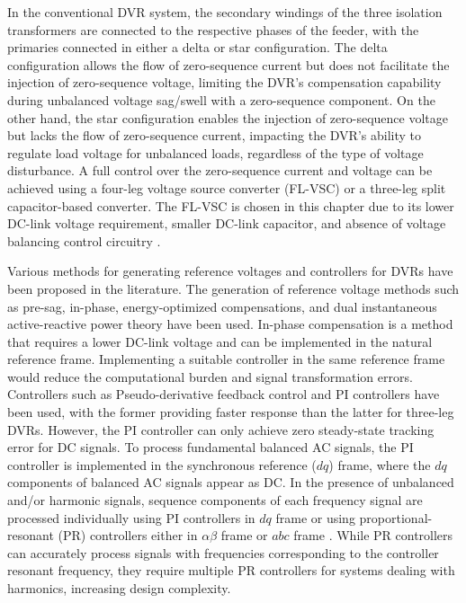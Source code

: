 In the conventional DVR system, the secondary windings of the three isolation transformers are connected to the respective phases of the feeder, with the primaries connected in either a delta or star configuration. The delta configuration allows the flow of zero-sequence current but does not facilitate the injection of zero-sequence voltage, limiting the DVR's compensation capability during unbalanced voltage sag/swell with a zero-sequence component. On the other hand, the star configuration enables the injection of zero-sequence voltage but lacks the flow of zero-sequence current, impacting the DVR's ability to regulate load voltage for unbalanced loads, regardless of the type of voltage disturbance. A full control over the zero-sequence current and voltage can be achieved using a four-leg voltage source converter (FL-VSC) or a three-leg split capacitor-based converter. The FL-VSC is chosen in this chapter due to its lower DC-link voltage requirement, smaller DC-link capacitor, and absence of voltage balancing control circuitry \cite{1214534,7134803,9162539,7884971}.

Various methods for generating reference voltages and controllers for DVRs have been proposed in the literature. The generation of reference voltage methods such as pre-sag, in-phase, energy-optimized compensations, and dual instantaneous active-reactive power theory \cite{6556997,1208380,1510825,8400555} have been used. In-phase compensation is a method that requires a lower DC-link voltage and can be implemented in the natural reference frame. Implementing a suitable controller in the same reference frame would reduce the computational burden and signal transformation errors. Controllers such as Pseudo-derivative feedback control \cite{9250485} and PI controllers \cite{9324809} have been used, with the former providing faster response than the latter for three-leg DVRs. However, the PI controller can only achieve zero steady-state tracking error for DC signals. To process fundamental balanced AC signals, the PI controller is implemented in the synchronous reference ($dq$) frame, where the $dq$ components of balanced AC signals appear as DC. In the presence of unbalanced and/or harmonic signals, sequence components of each frequency signal are processed individually using PI controllers in $dq$ frame \cite{8170301,8345740} or using proportional-resonant (PR) controllers either in $\alpha\beta$ frame or $abc$ frame \cite{4305325}. While PR controllers can accurately process signals with frequencies corresponding to the controller resonant frequency, they require multiple PR controllers for systems dealing with harmonics, increasing design complexity.   

